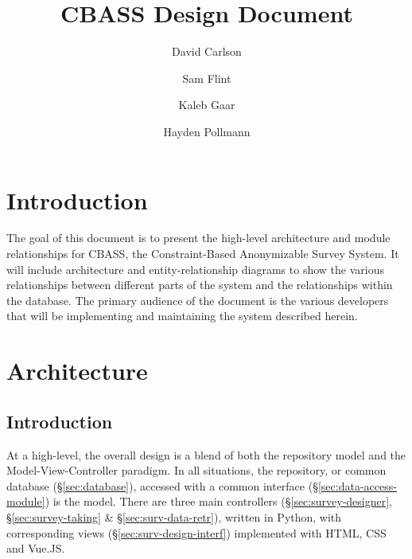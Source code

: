\documentclass{article}
\title{CBASS Design Document}
\author{David Carlson \and Sam Flint \and Kaleb Gaar \and Hayden Pollmann}
\begin{document}
\maketitle
\hypersetup{linkcolor=black}
\tableofcontents
\listoffigures
\hypersetup{linkcolor=red}

\section{Introduction}
\label{sec:introduction}

The goal of this document is to present the high-level architecture
and module relationships for CBASS, the Constraint-Based Anonymizable
Survey System.  It will include architecture and entity-relationship
diagrams to show the various relationships between different parts of
the system and the relationships within the database.  The primary
audience of the document is the various developers that will be
implementing and maintaining the system described herein.

\section{Architecture}
\label{sec:architecture}

\subsection{Introduction}
\label{sec:arch-introduction}

At a high-level, the overall design is a blend of both the repository
model and the Model-View-Controller paradigm.  In all situations, the
repository, or common database (\S\ref{sec:database}), accessed with a
common interface (\S\ref{sec:data-access-module}) is the model.  There
are three main controllers (\S\ref{sec:survey-designer},
\S\ref{sec:survey-taking} \& \S\ref{sec:surv-data-retr}), written in
Python, with corresponding views (\S\ref{sec:surv-design-interf})
implemented with HTML, CSS and Vue.JS.
\end{document}
